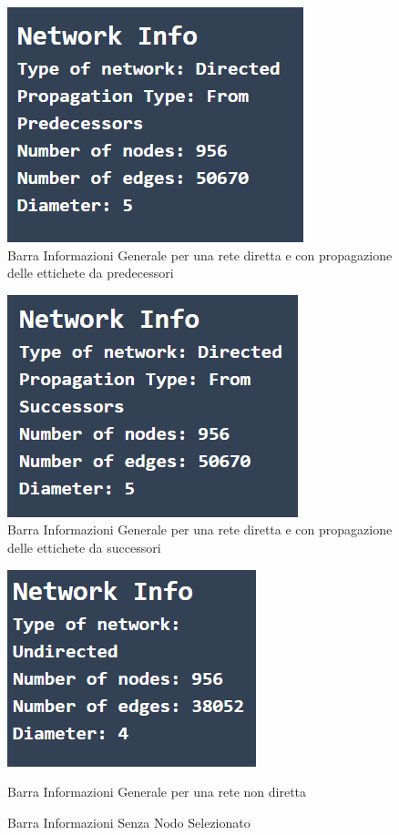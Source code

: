 \documentclass[a4paper,12pt]{report}
\begin{document}
			\begin{center}
				\begin{figure}[H]
				\centering
				\includegraphics[width=0.5\linewidth]{infobargeneralcustom}
				\caption{Barra Informazioni Generale per una rete diretta e con propagazione delle ettichete da predecessori}
				\end{figure}
				\begin{figure}[H]
				\centering
				\includegraphics[width=0.5\linewidth]{infobargeneralcustomdirectedsuccessors}
				\caption{Barra Informazioni Generale per una rete diretta e con propagazione delle ettichete da successori}
				\end{figure}
				\begin{figure}[H]
				\centering
				\includegraphics[width=0.5\linewidth]{infobargeneralcustomundirected}
				\caption{Barra Informazioni Generale per una rete non diretta}
				\caption{Barra Informazioni Senza Nodo Selezionato}
				\end{figure}
			\end{center}
\end{document}
